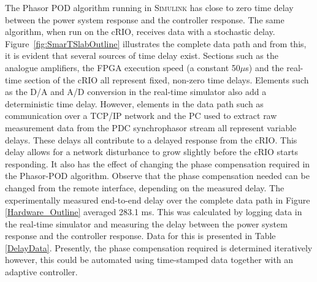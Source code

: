 \documentclass[journal]{IEEEtran}
\begin{document}
The Phasor POD algorithm running in \textsc{Simulink} has close to zero time delay between the power system response and the controller response. The same algorithm, when run on the cRIO, receives data with a stochastic delay. Figure~\ref{fig:SmarTSlabOutline} illustrates the complete data path and from this, it is evident that several sources of time delay exist. Sections such as the analogue amplifiers, the FPGA execution speed (a constant 50$\mu$s) and the real-time section of the cRIO all represent fixed, non-zero time delays. Elements such as the D/A and A/D conversion in the real-time simulator also add a deterministic time delay. However, elements in the data path such as communication over a TCP/IP network and the PC used to extract raw measurement data from the PDC synchrophasor stream all represent variable delays. These delays all contribute to a delayed response from the cRIO. This delay allows for a network disturbance to grow slightly before the cRIO starts responding. It also has the effect of changing the phase compensation required in the Phasor-POD algorithm. Observe that the phase compensation needed can be changed from the remote interface, depending on the measured delay. The experimentally measured end-to-end delay over the complete data path in Figure \ref{Hardware_Outline} averaged 283.1 ms. This was calculated by logging data in the real-time simulator and measuring the delay between the power system response and the controller response. Data for this is presented in Table \ref{DelayData}. Presently, the phase compensation required is determined iteratively however, this could be automated using time-stamped data together with an adaptive controller.
\end{document}

